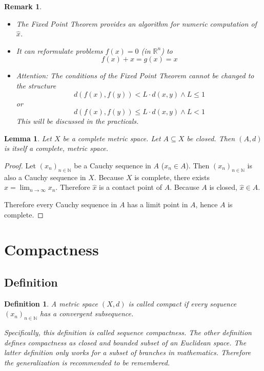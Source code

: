 \documentclass{article}
\newtheorem{definition}{Definition}  \numberwithin{definition}{section}
\newtheorem{lemma}{Lemma}  \numberwithin{lemma}{section}
\newtheorem{remark}{Remark}  \numberwithin{remark}{section}
\begin{document}
\begin{remark}
  \begin{itemize}
  	\item The Fixed Point Theorem provides an algorithm for numeric computation of $\hat{x}$.
    \item It can reformulate problems $f(x) = 0$ (in $\mathbb R^n$) to
      \[ f(x) + x = g(x) = x \]
    \item Attention: The conditions of the Fixed Point Theorem cannot be changed to the structure
      \[ d(f(x), f(y)) < L \cdot d(x, y) \land L \leq 1 \]
      or
      \[ d(f(x), f(y)) \leq L \cdot d(x, y) \land L < 1 \]
      This will be discussed in the practicals.
  \end{itemize}
\end{remark}

\begin{lemma} %
  \label{lemma7}
  Let $X$ be a complete metric space. Let $A \subseteq X$ be closed.
  Then $(A, d)$ is itself a complete, metric space.
\end{lemma}

\begin{proof}
  Let $(x_n)_{n \in \mathbb N}$ be a Cauchy sequence in $A$ ($x_n \in A$).
  Then $(x_n)_{n \in \mathbb N}$ is also a Cauchy sequence in $X$.
  Because $X$ is complete, there exists $\hat{x} = \lim_{n\to\infty} x_n$.
  Therefore $\hat{x}$ is a contact point of $A$.
  Because $A$ is closed, $\hat{x} \in A$.

  Therefore every Cauchy sequence in $A$ has a limit point in $A$,
  hence $A$ is complete.
\end{proof}

\section{Compactness}
\subsection{Definition}

\begin{definition} %
  A metric space $(X, d)$ is called \emph{compact} if every sequence $(x_n)_{n \in \mathbb N}$
  has a convergent subsequence.

  Specifically, this definition is called sequence compactness. The other definition defines compactness as closed and bounded subset of an Euclidean space. The latter definition only works for a subset of branches in mathematics. Therefore the generalization is recommended to be remembered.
\end{definition}
\end{document}
